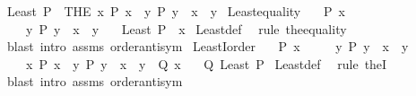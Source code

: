 \begin{isabellebody}
\ \ {\isachardoublequoteopen}Least\ P\ {\isacharequal}{\kern0pt}\ {\isacharparenleft}{\kern0pt}THE\ x{\isachardot}{\kern0pt}\ P\ x\ {\isasymand}\ {\isacharparenleft}{\kern0pt}{\isasymforall}y{\isachardot}{\kern0pt}\ P\ y\ {\isasymlongrightarrow}\ x\ {\isasymle}\ y{\isacharparenright}{\kern0pt}{\isacharparenright}{\kern0pt}{\isachardoublequoteclose}\isanewline
\isanewline
{}\isamarkupfalse%
\ Least{\isacharunderscore}{\kern0pt}equality{\isacharcolon}{\kern0pt}\isanewline
\ \ \ {\isachardoublequoteopen}P\ x{\isachardoublequoteclose}\isanewline
\ \ \ \ \ {\isachardoublequoteopen}{\isasymAnd}y{\isachardot}{\kern0pt}\ P\ y\ {\isasymLongrightarrow}\ x\ {\isasymle}\ y{\isachardoublequoteclose}\isanewline
\ \ \ {\isachardoublequoteopen}Least\ P\ {\isacharequal}{\kern0pt}\ x{\isachardoublequoteclose}\isanewline
%
\isadelimproof
%
\endisadelimproof
%
\isatagproof
{}\isamarkupfalse%
\ Least{\isacharunderscore}{\kern0pt}def\ \isamarkupfalse%
\ {\isacharparenleft}{\kern0pt}rule\ the{\isacharunderscore}{\kern0pt}equality{\isacharparenright}{\kern0pt}\isanewline
\ \ {\isacharparenleft}{\kern0pt}blast\ intro{\isacharcolon}{\kern0pt}\ assms\ order{\isachardot}{\kern0pt}antisym{\isacharparenright}{\kern0pt}{\isacharplus}{\kern0pt}%
\endisatagproof
{\isafoldproof}%
%
\isadelimproof
\isanewline
%
\endisadelimproof
\isanewline
{}\isamarkupfalse%
\ LeastI{}{\isacharunderscore}{\kern0pt}order{\isacharcolon}{\kern0pt}\isanewline
\ \ \ {\isachardoublequoteopen}P\ x{\isachardoublequoteclose}\isanewline
\ \ \ \ \ {\isachardoublequoteopen}{\isasymAnd}y{\isachardot}{\kern0pt}\ P\ y\ {\isasymLongrightarrow}\ x\ {\isasymle}\ y{\isachardoublequoteclose}\isanewline
\ \ \ \ \ {\isachardoublequoteopen}{\isasymAnd}x{\isachardot}{\kern0pt}\ P\ x\ {\isasymLongrightarrow}\ {\isasymforall}y{\isachardot}{\kern0pt}\ P\ y\ {\isasymlongrightarrow}\ x\ {\isasymle}\ y\ {\isasymLongrightarrow}\ Q\ x{\isachardoublequoteclose}\isanewline
\ \ \ {\isachardoublequoteopen}Q\ {\isacharparenleft}{\kern0pt}Least\ P{\isacharparenright}{\kern0pt}{\isachardoublequoteclose}\isanewline
%
\isadelimproof
%
\endisadelimproof
%
\isatagproof
{}\isamarkupfalse%
\ Least{\isacharunderscore}{\kern0pt}def\ \isamarkupfalse%
\ {\isacharparenleft}{\kern0pt}rule\ theI{}{\isacharparenright}{\kern0pt}\isanewline
\ \ {\isacharparenleft}{\kern0pt}blast\ intro{\isacharcolon}{\kern0pt}\ assms\ order{\isachardot}{\kern0pt}antisym{\isacharparenright}{\kern0pt}{\isacharplus}{\kern0pt}%

\end{isabellebody}
